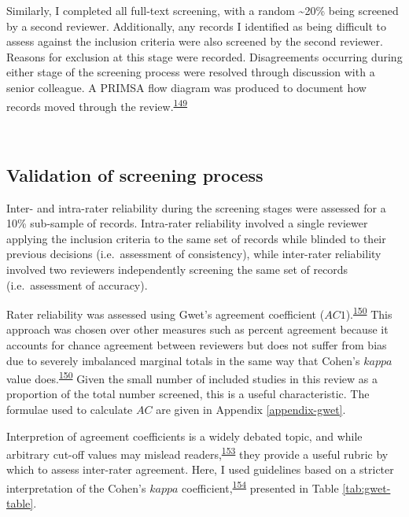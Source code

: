 \documentclass[a4paper, twoside]{templates/ociamthesis}
\begin{document}
Similarly, I completed all full-text screening, with a random \textasciitilde20\% being screened by a second reviewer. Additionally, any records I identified as being difficult to assess against the inclusion criteria were also screened by the second reviewer. Reasons for exclusion at this stage were recorded. Disagreements occurring during either stage of the screening process were resolved through discussion with a senior colleague. A PRIMSA flow diagram was produced to document how records moved through the review.\textsuperscript{\protect\hyperlink{ref-page2021}{149}}

~

\hypertarget{validation-of-screening-process}{%
\subsection{Validation of screening process}\label{validation-of-screening-process}}

Inter- and intra-rater reliability during the screening stages were assessed for a 10\% sub-sample of records. Intra-rater reliability involved a single reviewer applying the inclusion criteria to the same set of records while blinded to their previous decisions (i.e.~assessment of consistency), while inter-rater reliability involved two reviewers independently screening the same set of records (i.e.~assessment of accuracy).

Rater reliability was assessed using Gwet's agreement coefficient (\(AC1\)).\textsuperscript{\protect\hyperlink{ref-gwet2008}{150}} This approach was chosen over other measures such as percent agreement because it accounts for chance agreement between reviewers but does not suffer from bias due to severely imbalanced marginal totals in the same way that Cohen's \(kappa\) value does.\textsuperscript{\protect\hyperlink{ref-gwet2008}{150}} Given the small number of included studies in this review as a proportion of the total number screened, this is a useful characteristic. The formulae used to calculate \(AC\) are given in Appendix \ref{appendix-gwet}.

Interpretion of agreement coefficients is a widely debated topic, and while arbitrary cut-off values may mislead readers,\textsuperscript{\protect\hyperlink{ref-brennan1992}{153}} they provide a useful rubric by which to assess inter-rater agreement. Here, I used guidelines based on a stricter interpretation of the Cohen's \(kappa\) coefficient,\textsuperscript{\protect\hyperlink{ref-mchugh2012}{154}} presented in Table \ref{tab:gwet-table}.
\end{document}
